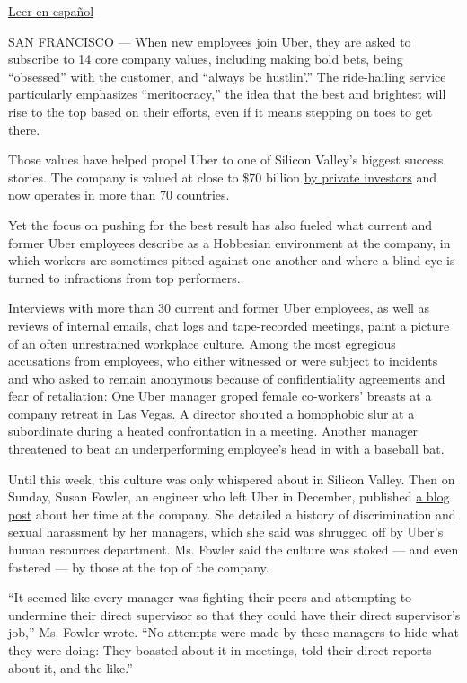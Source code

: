 \href{https://www.nytimes3xbfgragh.onion/es/2017/02/27/uber-y-su-cultura-de-trabajo-agresiva/}{Leer
en español}

SAN FRANCISCO --- When new employees join Uber, they are asked to
subscribe to 14 core company values, including making bold bets, being
``obsessed'' with the customer, and ``always be hustlin'.'' The
ride-hailing service particularly emphasizes ``meritocracy,'' the idea
that the best and brightest will rise to the top based on their efforts,
even if it means stepping on toes to get there.

Those values have helped propel Uber to one of Silicon Valley's biggest
success stories. The company is valued at close to \$70 billion
\href{https://www.nytimes3xbfgragh.onion/2016/06/02/technology/uber-investment-saudi-arabia.html}{by
private investors} and now operates in more than 70 countries.

Yet the focus on pushing for the best result has also fueled what
current and former Uber employees describe as a Hobbesian environment at
the company, in which workers are sometimes pitted against one another
and where a blind eye is turned to infractions from top performers.

Interviews with more than 30 current and former Uber employees, as well
as reviews of internal emails, chat logs and tape-recorded meetings,
paint a picture of an often unrestrained workplace culture. Among the
most egregious accusations from employees, who either witnessed or were
subject to incidents and who asked to remain anonymous because of
confidentiality agreements and fear of retaliation: One Uber manager
groped female co-workers' breasts at a company retreat in Las Vegas. A
director shouted a homophobic slur at a subordinate during a heated
confrontation in a meeting. Another manager threatened to beat an
underperforming employee's head in with a baseball bat.

Until this week, this culture was only whispered about in Silicon
Valley. Then on Sunday, Susan Fowler, an engineer who left Uber in
December, published
\href{https://www.susanjfowler.com/blog/2017/2/19/reflecting-on-one-very-strange-year-at-uber}{a
blog post} about her time at the company. She detailed a history of
discrimination and sexual harassment by her managers, which she said was
shrugged off by Uber's human resources department. Ms. Fowler said the
culture was stoked --- and even fostered --- by those at the top of the
company.

``It seemed like every manager was fighting their peers and attempting
to undermine their direct supervisor so that they could have their
direct supervisor's job,'' Ms. Fowler wrote. ``No attempts were made by
these managers to hide what they were doing: They boasted about it in
meetings, told their direct reports about it, and the like.''

